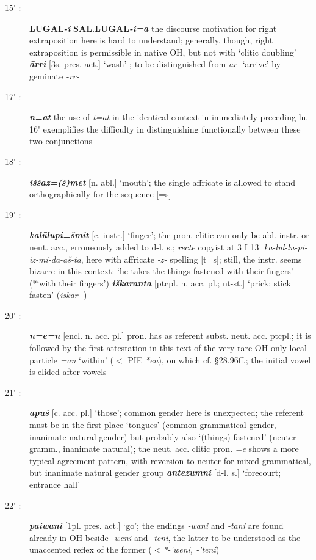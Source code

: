 \documentclass[10pt]{article}
\newcommand{\bit}[1]{\textbf{\textit{#1}}}				%
\newcommand{\p}[1]{{\tiny[{#1}]}}					%
\newcommand{\pr}{\'{ }}									%
\newcommand{\hith}{\textsubwedge{h}}
\renewcommand{\.}[1]{\textsubdot{#1}}
\begin{document}
\begin{description}
\item[15{\pr} :] \textbf{LUGAL}\bit{-i} \textbf{SAL.LUGAL}\bit{-i=a} the discourse motivation for right extraposition here is hard to understand; generally, though, right extraposition is permissible in native OH, but not with `clitic doubling' \bit{\=arri} \p{3s. pres. act.} `wash' ; to be distinguished from \textit{ar-} `arrive' by geminate \textit{-rr-}

\item[17{\pr} :] \bit{n=at} the use of \textit{t=at} in the identical context in immediately preceding ln. 16{\pr} exemplifies the difficulty in distinguishing functionally between these two conjunctions

\item[18{\pr} :] \bit{i\v{s}\v{s}az=(\v{s})met} \p{n. abl.} `mouth'; the single affricate is allowed to stand orthographically for the sequence [{\texttslig}=s]

\item[19{\pr} :] \bit{kal\=ulupi=\v{s}mit} \p{c. instr.} `finger'; the pron. clitic can only be abl.-instr. or neut. acc., erroneously added to d-l. s.; \textit{recte} copyist at 3 I 13{\pr} \textit{ka-lul-lu-pi-iz-mi-da-a\v{s}-ta}, here with affricate \textit{-z-} spelling [t=s]; still, the instr. seems bizarre in this context: `he takes the things fastened with their fingers'  ({*}`with their fingers') \bit{i\v{s}karanta} \p{ptcpl. n. acc. pl.; nt-st.} `prick; stick fasten' (\textit{iskar}- )

\item[20{\pr} :] \bit{n=e=n} \p{encl. n. acc. pl.} pron. has as referent subst. neut. acc. ptcpl.; it is followed by the first attestation in this text of the very rare OH-only local particle \textit{=an} `within' ($<$ PIE \textit{*en}), on which cf.  \S28.96ff.; the initial vowel is elided after vowels

\item[21{\pr} :] \bit{ap\=u\v{s}} \p{c. acc. pl.} `those'; common gender here is unexpected; the referent must be in the first place `tongues' (common grammatical gender, inanimate natural gender) but probably also `(things) fastened' (neuter gramm., inanimate natural); the neut. acc. clitic pron. \textit{=e} shows a more typical agreement pattern, with reversion to neuter for mixed grammatical, but inanimate natural gender group \bit{{\hith}antezumni} \p{d-l. s.} `forecourt; entrance hall'

\item[22{\pr} :] \bit{paiwani} \p{1pl. pres. act.} `go'; the endings \textit{-wani} and \textit{-tani} are found already in OH beside \textit{-weni} and \textit{-teni}, the latter to be understood as the unaccented reflex of the former ($<$\textit{*-{\pr}weni, -{\pr}teni})


\end{description}
\end{document}
